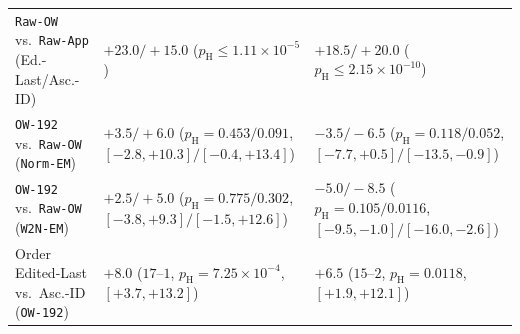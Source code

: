 \documentclass[11pt]{article}
\renewcommand{\_}{\origunderscore\allowbreak}
\begin{document}
\begin{table}[t]
{\begin{tabular}{@{}lccccc@{}}
\texttt{Raw-OW} vs.\ \texttt{Raw-App} (Ed.-Last/Asc.-ID) & \multicolumn{2}{l}{$+23.0/+15.0$ ($p_{\text{H}}\le 1.11\times 10^{-5}$)} & \multicolumn{3}{l}{$+18.5/+20.0$ ($p_{\text{H}}\le 2.15\times 10^{-10}$)} \\
\texttt{OW-192} vs.\ \texttt{Raw-OW} (\texttt{Norm-EM}) & \multicolumn{2}{l}{$+3.5/+6.0$ ($p_{\text{H}}=0.453/0.091$, $[-2.8,+10.3]/[-0.4,+13.4]$)} & \multicolumn{3}{l}{$-3.5/-6.5$ ($p_{\text{H}}=0.118/0.052$, $[-7.7,+0.5]/[-13.5,-0.9]$)} \\
\texttt{OW-192} vs.\ \texttt{Raw-OW} (\texttt{W2N-EM}) & \multicolumn{2}{l}{$+2.5/+5.0$ ($p_{\text{H}}=0.775/0.302$, $[-3.8,+9.3]/[-1.5,+12.6]$)} & \multicolumn{3}{l}{$-5.0/-8.5$ ($p_{\text{H}}=0.105/\mathbf{0.0116}$, $[-9.5,-1.0]/[-16.0,-2.6]$)} \\
Order Edited-Last vs.\ Asc.-ID (\texttt{OW-192}) & \multicolumn{2}{l}{$+8.0$ ($17$--$1$, $p_{\text{H}}=7.25\times 10^{-4}$, $[+3.7,+13.2]$)} & \multicolumn{3}{l}{$+6.5$ ($15$--$2$, $p_{\text{H}}=0.0118$, $[+1.9,+12.1]$)} \\
\bottomrule
\end{tabular}%
}
\end{table}
\end{document}
